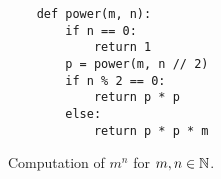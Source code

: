 \begin{figure}[!h]
  \centering
\begin{verbatim}
    def power(m, n):
        if n == 0:
            return 1
        p = power(m, n // 2)
        if n % 2 == 0:
            return p * p
        else:
            return p * p * m
\end{verbatim}
\vspace*{-0.3cm}
  \caption{Computation of $m^n$ for $m,n \in {\mathbb N}$.}
  \label{fig:power.stlx}
\end{figure} 

